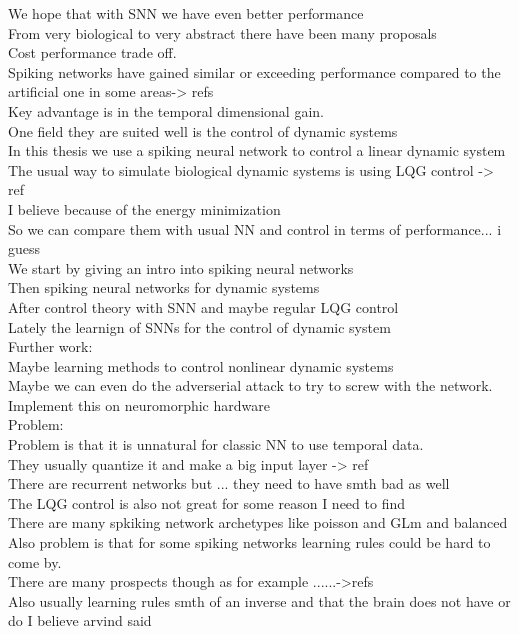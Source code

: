 We hope that with SNN we have even better performance\\
From very biological to very abstract there have been many proposals\\
Cost performance trade off.\\
Spiking networks have gained similar or exceeding performance compared to the artificial one in some areas-> refs\\
Key advantage is in the temporal dimensional gain.\\
One field they are suited well is the control of dynamic systems\\
In this thesis we use a spiking neural network to control a linear dynamic system\\
The usual way to simulate biological dynamic systems is using LQG control -> ref\\
I believe because of the energy minimization\\
So we can compare them with usual NN and control in terms of performance... i guess\\
We start by giving an intro into spiking neural networks\\
Then spiking neural networks for dynamic systems\\
After control theory with SNN and maybe regular LQG control\\
Lately the learnign of SNNs for the control of dynamic system\\

Further work:\\
Maybe learning methods to control nonlinear dynamic systems\\
Maybe we can even do the adverserial attack to try to screw with the network.\\
Implement this on neuromorphic hardware\\

Problem:\\
Problem is that it is unnatural for classic NN to use temporal data.\\
They usually quantize it and make a big input layer -> ref\\
There are recurrent networks but ... they need to have smth bad as well\\
The LQG control is also not great for some reason I need to find\\
There are many spkiking network archetypes like poisson and GLm and balanced\\
Also problem is that for some spiking networks learning rules could be hard to come by.\\
There are many prospects though as for example ......->refs\\
Also usually learning rules smth of an inverse and that the brain does not have or do I believe arvind said\\



